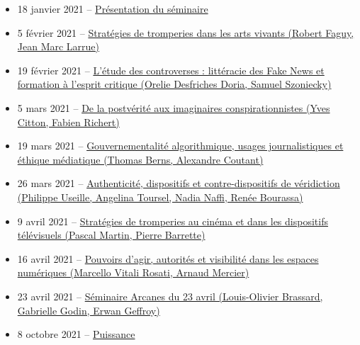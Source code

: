 \documentclass[
  a4paper,
  DIV=11,
  numbers=noendperiod]{scrreprt}
\begin{document}
\begin{itemize}
\item
  18 janvier 2021 --
  \href{https://crilcq.arcanes.ca/event/presentation-du-seminaire/}{Présentation
  du séminaire}
\item
  5 février 2021 --
  \href{https://crilcq.arcanes.ca/event/strategies-de-tromperies-dans-les-arts-vivants/}{Stratégies
  de tromperies dans les arts vivants (Robert Faguy, Jean Marc Larrue)}
\item
  19 février 2021 --
  \href{https://crilcq.arcanes.ca/event/letude-des-controverses-litteracie-des-fake-news-et-formation-a-lesprit-critique/}{L'étude
  des controverses : littéracie des Fake News et formation à l'esprit
  critique (Orelie Desfriches Doria, Samuel Szoniecky)}
\item
  5 mars 2021 --
  \href{https://crilcq.arcanes.ca/event/de-la-postverite-aux-imaginaires-conspirationnistes/}{De
  la postvérité aux imaginaires conspirationnistes (Yves Citton, Fabien
  Richert)}
\item
  19 mars 2021 --
  \href{https://crilcq.arcanes.ca/event/gouvernementalite-algorithmique-usages-journalistiques-et-ethique-mediatique/}{Gouvernementalité
  algorithmique, usages journalistiques et éthique médiatique (Thomas
  Berns, Alexandre Coutant)}
\item
  26 mars 2021 --
  \href{https://crilcq.arcanes.ca/event/authenticite-dispositifs-et-contre-dispositifs-de-veridiction/}{Authenticité,
  dispositifs et contre-dispositifs de véridiction (Philippe Useille,
  Angelina Toursel, Nadia Naffi, Renée Bourassa)}
\item
  9 avril 2021 --
  \href{https://crilcq.arcanes.ca/event/strategies-de-tromperies-au-cinema-et-dans-les-dispositifs-televisuels/}{Stratégies
  de tromperies au cinéma et dans les dispositifs télévisuels (Pascal
  Martin, Pierre Barrette)}
\item
  16 avril 2021 --
  \href{https://crilcq.arcanes.ca/event/pouvoirs-dagir-autorites-et-visibilite-dans-les-espaces-numeriques/}{Pouvoirs
  d'agir, autorités et visibilité dans les espaces numériques (Marcello
  Vitali Rosati, Arnaud Mercier)}
\item
  23 avril 2021 --
  \href{https://crilcq.arcanes.ca/event/seminaire-arcanes-du-23-avril/}{Séminaire
  Arcanes du 23 avril (Louis-Olivier Brassard, Gabrielle Godin, Erwan
  Geffroy)}
\item
  8 octobre 2021 --
  \href{https://crilcq.arcanes.ca/event/puissance-du-faux-dans-les-arts-trompeurs-et-lecosysteme-socionumerique-lancement-du-livre-ecridil/}{Puissance
}
\end{itemize}
\end{document}
